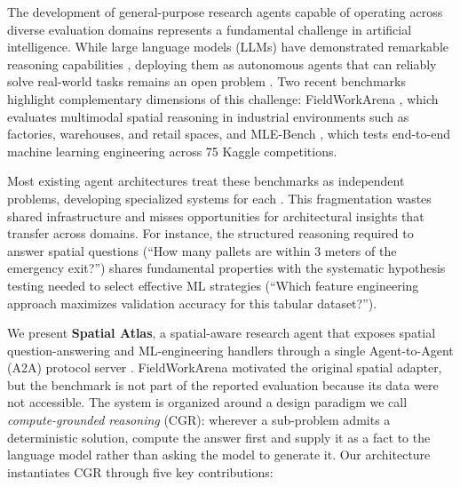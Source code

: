 \documentclass{article}
\begin{document}
The development of general-purpose research agents capable of operating across diverse evaluation domains represents a fundamental challenge in artificial intelligence. While large language models (LLMs) have demonstrated remarkable reasoning capabilities \citep{openai2023gpt4, anthropic2024claude}, deploying them as autonomous agents that can reliably solve real-world tasks remains an open problem \citep{wang2024survey}. Two recent benchmarks highlight complementary dimensions of this challenge: FieldWorkArena \citep{fieldworkarena2025}, which evaluates multimodal spatial reasoning in industrial environments such as factories, warehouses, and retail spaces, and MLE-Bench \citep{chan2024mlebench}, which tests end-to-end machine learning engineering across 75 Kaggle competitions.

\smallskip
Most existing agent architectures treat these benchmarks as independent problems, developing specialized systems for each \citep{yang2024sweagent, hong2024opendevin}. This fragmentation wastes shared infrastructure and misses opportunities for architectural insights that transfer across domains. For instance, the structured reasoning required to answer spatial questions (``How many pallets are within 3 meters of the emergency exit?'') shares fundamental properties with the systematic hypothesis testing needed to select effective ML strategies (``Which feature engineering approach maximizes validation accuracy for this tabular dataset?'').

\smallskip
We present \textbf{Spatial Atlas}, a spatial-aware research agent that exposes spatial question-answering and ML-engineering handlers through a single Agent-to-Agent (A2A) protocol server \citep{google2024a2a}. FieldWorkArena motivated the original spatial adapter, but the benchmark is not part of the reported evaluation because its data were not accessible. The system is organized around a design paradigm we call \emph{compute-grounded reasoning} (CGR): wherever a sub-problem admits a deterministic solution, compute the answer first and supply it as a fact to the language model rather than asking the model to generate it. Our architecture instantiates CGR through five key contributions:
\end{document}
